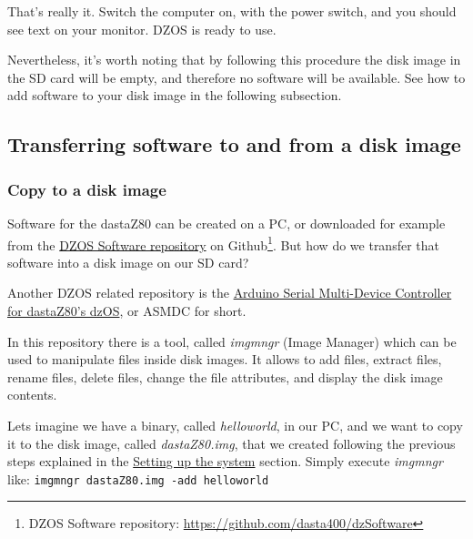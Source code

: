 That’s really it. Switch the computer on, with the power switch, and you
should see text on your monitor. DZOS is ready to use.

Nevertheless, it's worth noting that by following this procedure the disk
image in the SD card will be empty, and therefore no software will be
available. See how to add software to your disk image in the following
subsection.

    \subsection{Transferring software to and from a disk image}

        \subsubsection{Copy to a disk image}

        Software for the dastaZ80 can be created on a PC, or downloaded for example
        from the \href{https://github.com/dasta400/dzSoftware}{DZOS Software repository}
        on Github\footnote{DZOS Software repository: 
        \url{https://github.com/dasta400/dzSoftware}}. But how do we transfer that
        software into a disk image on our SD card?

        Another DZOS related repository is the \href{https://github.com/dasta400/asmdc}
        {Arduino Serial Multi-Device Controller for dastaZ80's dzOS}, or ASMDC for
        short.

        In this repository there is a tool, called \textit{imgmngr} (Image Manager)
        which can be used to manipulate files inside disk images. It allows to add
        files, extract files, rename files, delete files, change the file attributes,
        and display the disk image contents.

        Lets imagine we have a binary, called \textit{helloworld}, in our PC, and we
        want to copy it to the disk image, called \textit{dastaZ80.img}, that we
        created following the previous steps explained in the
        \hyperref[sec:setting_system]{Setting up the system} section. Simply execute
        \textit{imgmngr} like: \texttt{imgmngr dastaZ80.img -add helloworld}

